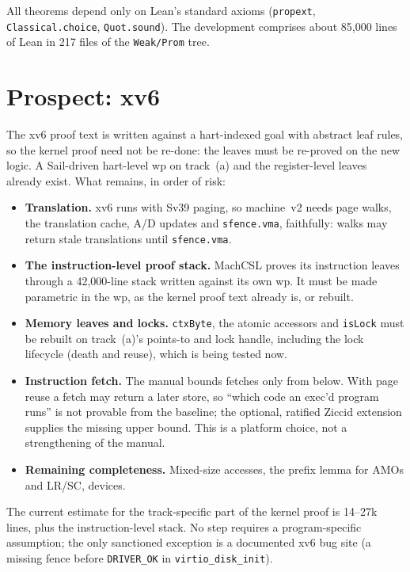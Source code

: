 \documentclass[sigplan,screen,nonacm]{acmart}
\newcommand{\vtwo}{machine~v2\xspace}
\newcommand{\code}[1]{\texttt{#1}}
\begin{document}
\noindent All theorems depend only on Lean's standard axioms (\code{propext}, \code{Classical.choice},
\code{Quot.sound}). The development comprises about 85{,}000 lines of Lean in 217 files of the \code{Weak/Prom} tree.

\section{Prospect: xv6}

The xv6 proof text is written against a hart-indexed goal with abstract leaf rules, so the kernel proof need not be
re-done: the leaves must be re-proved on the new logic. A Sail-driven hart-level wp on track~(a) and the
register-level leaves already exist. What remains, in order of risk:
\begin{itemize}
\item \textbf{Translation.} xv6 runs with Sv39 paging, so \vtwo needs page walks, the translation cache, A/D updates
  and \code{sfence.vma}, faithfully: walks may return stale translations until \code{sfence.vma}.
\item \textbf{The instruction-level proof stack.} MachCSL proves its instruction leaves through a 42{,}000-line stack
  written against its own wp. It must be made parametric in the wp, as the kernel proof text already is, or rebuilt.
\item \textbf{Memory leaves and locks.} \code{ctxByte}, the atomic accessors and \code{isLock} must be rebuilt on
  track~(a)'s points-to and lock handle, including the lock lifecycle (death and reuse), which is being tested now.
\item \textbf{Instruction fetch.} The manual bounds fetches only from below. With page reuse a fetch may return a
  later store, so ``which code an exec'd program runs'' is not provable from the baseline; the optional, ratified
  Ziccid extension supplies the missing upper bound. This is a platform choice, not a strengthening of the manual.
\item \textbf{Remaining completeness.} Mixed-size accesses, the prefix lemma for AMOs and LR/SC, devices.
\end{itemize}
\noindent The current estimate for the track-specific part of the kernel proof is 14--27k lines, plus the
instruction-level stack. No step requires a program-specific assumption; the only sanctioned exception is a
documented xv6 bug site (a missing fence before \code{DRIVER\_OK} in \code{virtio\_disk\_init}).
\end{document}
